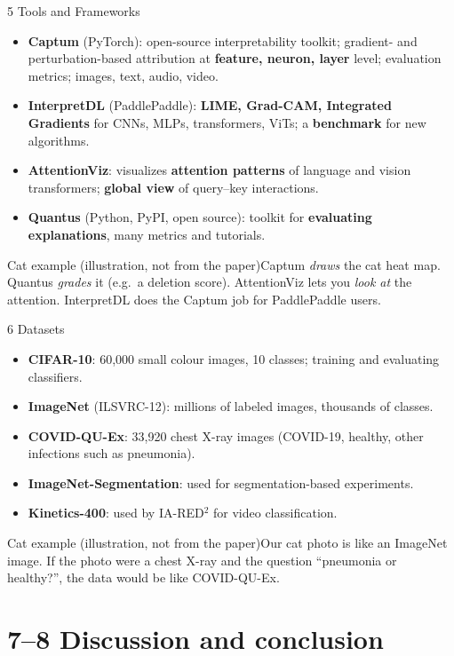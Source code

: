 \documentclass[10pt]{beamer}
\newcommand{\highlight}[1]{\textcolor{myNewColorA}{\textbf{#1}}}
\newcommand{\catex}[1]{\begin{exampleblock}{\footnotesize Cat example (illustration, not from the paper)}\footnotesize #1\end{exampleblock}}
\begin{document}
\begin{frame}{5 Tools and Frameworks}
\small
\begin{itemize}
\item \highlight{Captum} (PyTorch): open-source interpretability toolkit; gradient- and perturbation-based attribution at \textbf{feature, neuron, layer} level; evaluation metrics; images, text, audio, video.
\item \highlight{InterpretDL} (PaddlePaddle): \textbf{LIME, Grad-CAM, Integrated Gradients} for CNNs, MLPs, transformers, ViTs; a \textbf{benchmark} for new algorithms.
\item \highlight{AttentionViz}: visualizes \textbf{attention patterns} of language and vision transformers; \textbf{global view} of query--key interactions.
\item \highlight{Quantus} (Python, PyPI, open source): toolkit for \textbf{evaluating explanations}, many metrics and tutorials.
\end{itemize}
\vspace{0.2em}
\catex{Captum \emph{draws} the cat heat map. Quantus \emph{grades} it (e.g.\ a deletion score). AttentionViz lets you \emph{look at} the attention. InterpretDL does the Captum job for PaddlePaddle users.}
\end{frame}

\begin{frame}{6 Datasets}
\small
\begin{itemize}
\item \highlight{CIFAR-10}: 60,000 small colour images, 10 classes; training and evaluating classifiers.
\item \highlight{ImageNet} (ILSVRC-12): millions of labeled images, thousands of classes.
\item \highlight{COVID-QU-Ex}: 33,920 chest X-ray images (COVID-19, healthy, other infections such as pneumonia).
\item \highlight{ImageNet-Segmentation}: used for segmentation-based experiments.
\item \highlight{Kinetics-400}: used by IA-RED$^2$ for video classification.
\end{itemize}
\vspace{0.2em}
\catex{Our cat photo is like an ImageNet image. If the photo were a chest X-ray and the question ``pneumonia or healthy?'', the data would be like COVID-QU-Ex.}
\end{frame}

\section{7--8 Discussion and conclusion}
\end{document}
